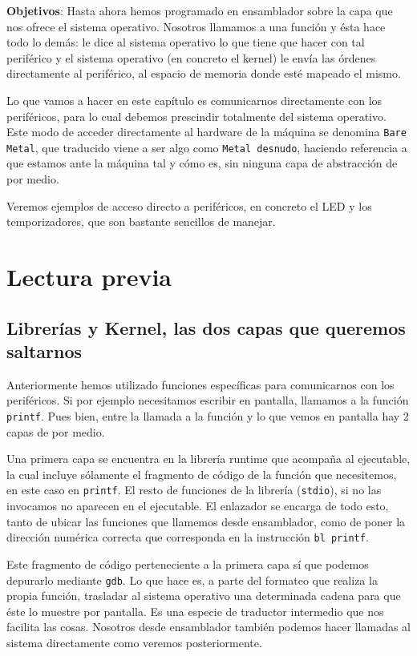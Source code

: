 
\label{chp:Subrut}
\minitoc

{\bf Objetivos}: Hasta ahora hemos programado en ensamblador sobre
la capa que nos ofrece el sistema operativo. Nosotros llamamos a una
función y ésta hace todo lo demás: le dice al sistema operativo lo
que tiene que hacer con tal periférico y el sistema operativo (en concreto
el kernel) le envía las órdenes directamente al periférico, al espacio
de memoria donde esté mapeado el mismo.

Lo que vamos a hacer en este capítulo es comunicarnos directamente con los
periféricos, para lo cual debemos prescindir totalmente del sistema operativo.
Este modo de acceder directamente al hardware de la máquina se denomina {\tt Bare Metal},
que traducido viene a ser algo como {\tt Metal desnudo}, haciendo referencia a
que estamos ante la máquina tal y cómo es, sin ninguna capa de abstracción de
por medio.

Veremos ejemplos de acceso directo a periféricos, en concreto el LED y los temporizadores,
que son bastante sencillos de manejar.


\section{Lectura previa}

\subsection{Librerías y Kernel, las dos capas que queremos saltarnos}

Anteriormente hemos utilizado funciones específicas para
comunicarnos con los periféricos. Si por ejemplo necesitamos escribir
en pantalla, llamamos a la función {\tt printf}. Pues bien, entre
la llamada a la función y lo que vemos en pantalla hay 2 capas de por medio.

Una primera capa se encuentra en la librería runtime que acompaña al
ejecutable, la cual incluye sólamente el fragmento de código de la
función que necesitemos, en este caso en {\tt printf}. El resto de
funciones de la librería ({\tt stdio}), si no las invocamos no aparecen
en el ejecutable. El enlazador se encarga de todo esto, tanto de ubicar
las funciones que llamemos desde ensamblador, como de poner la dirección
numérica correcta que corresponda en la instrucción {\tt bl printf}.

Este fragmento de código perteneciente a la primera capa sí que podemos
depurarlo mediante {\tt gdb}. Lo que hace es, a parte del formateo que
realiza la propia función, trasladar al sistema operativo una determinada
cadena para que éste lo muestre por pantalla. Es una especie de traductor
intermedio que nos facilita las cosas. Nosotros desde ensamblador también
podemos hacer llamadas al sistema directamente como veremos posteriormente.

